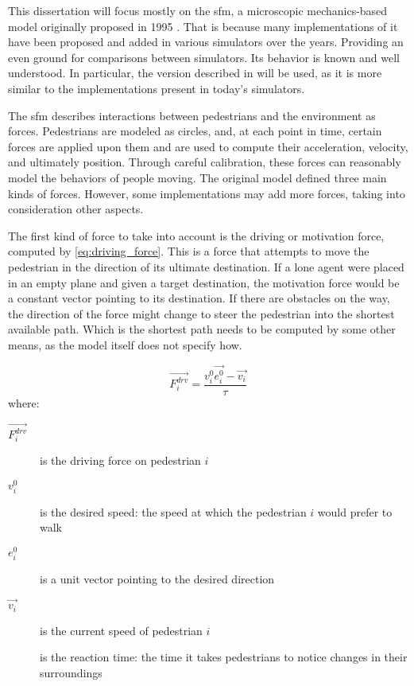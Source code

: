 \documentclass[twoside, 11pt]{article}
\begin{document}
This dissertation will focus mostly on the \gls{sfm}, a microscopic mechanics-based model originally proposed in 1995 \cite{helbingSocialForceModel1995}. That is because many implementations of it have been proposed and added in various simulators over the years. Providing an even ground for comparisons between simulators. Its behavior is known and well understood. In particular, the version described in \cite{helbingSimulatingDynamicFeatures2000} will be used, as it is more similar to the implementations present in today's simulators.

The \gls{sfm} describes interactions between pedestrians and the environment as forces. Pedestrians are modeled as circles, and, at each point in time, certain forces are applied upon them and are used to compute their acceleration, velocity, and ultimately position. Through careful calibration, these forces can reasonably model the behaviors of people moving. The original model defined three main kinds of forces. However, some implementations may add more forces, taking into consideration other aspects.

The first kind of force to take into account is the driving or motivation force, computed by \autoref{eq:driving_force}. This is a force that attempts to move the pedestrian in the direction of its ultimate destination. If a lone agent were placed in an empty plane and given a target destination, the motivation force would be a constant vector pointing to its destination. If there are obstacles on the way, the direction of the force might change to steer the pedestrian into the shortest available path. Which is the shortest path needs to be computed by some other means, as the model itself does not specify how.

\begin{equation}
  \vec{F_i^{drv}} = \frac{v_i^0 \vec{e_i^0} - \vec{v_i}}{\tau}
  \label{eq:driving_force}
\end{equation}
where:
\begin{description}
  \item[$\vec{F_i^{drv}}$] is the driving force on pedestrian $i$
  \item[$v_i^0$] is the desired speed: the speed at which the pedestrian $i$ would prefer to walk
  \item[$e_i^0$] is a unit vector pointing to the desired direction
  \item[$\vec{v_i}$] is the current speed of pedestrian $i$
  \item[\tau] is the reaction time: the time it takes pedestrians to notice changes in their surroundings 
\end{description}
\end{document}
